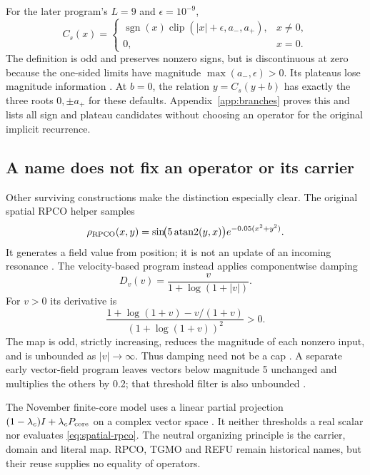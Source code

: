\documentclass[11pt,a4paper]{article}
\theoremstyle{definition}
\DeclareMathOperator{\sgn}{sgn}
\DeclareMathOperator{\clip}{clip}
\numberwithin{equation}{section}
\begin{document}
For the later program's $L=9$ and $\epsilon=10^{-9}$,
\begin{equation}
 C_s(x)=
 \begin{cases}
 \sgn(x)\clip(|x|+\epsilon,a_-,a_+),&x\ne0,\\
 0,&x=0.
 \end{cases}
 \label{eq:signed-branches}
\end{equation}
The definition is odd and preserves nonzero signs, but is discontinuous at
zero because the one-sided limits have magnitude
$\max(a_-,\epsilon)>0$. Its plateaus lose magnitude information
\cite[lines 49--53]{Infinity}.
At $b=0$, the relation $y=C_s(y+b)$ has exactly the three roots
$0,\pm a_+$ for these defaults. Appendix~\ref{app:branches} proves this
and lists all sign and plateau candidates without choosing an operator
for the original implicit recurrence.

\subsection{A name does not fix an operator or its carrier}

Other surviving constructions make the distinction especially clear.
The original spatial RPCO helper samples
\begin{equation}
 \rho_{\rm RPCO}(x,y)=
 \sin\!\bigl(5\operatorname{atan2}(y,x)\bigr)
 e^{-0.05(x^2+y^2)}.
 \label{eq:spatial-rpco}
\end{equation}
It generates a field value from position; it is not an update of an incoming
resonance \cite[lines 5--13]{RPCO}.
The velocity-based program instead applies componentwise damping
\begin{equation}
 D_v(v)=\frac{v}{1+\log(1+|v|)}.
 \label{eq:velocity-damping}
\end{equation}
For $v>0$ its derivative is
\[
 \frac{1+\log(1+v)-v/(1+v)}
      {(1+\log(1+v))^2}>0.
\]
The map is odd, strictly increasing, reduces the magnitude of each nonzero
input, and is unbounded as $|v|\to\infty$. Thus damping need not be a cap
\cite[lines 29--31]{Attractor}.
A separate early vector-field program leaves vectors below magnitude 5
unchanged and multiplies the others by 0.2; that threshold filter is also
unbounded \cite[lines 28--32]{Helicity}.

The November finite-core model uses a linear partial projection
$(1-\lambda_c)I+\lambda_c P_{\rm core}$ on a complex vector space
\cite[physical p.~5, \S3.1]{P15}. It neither thresholds a real scalar nor
evaluates \eqref{eq:spatial-rpco}. The neutral organizing principle is the
carrier, domain and literal map. RPCO, TGMO and REFU remain historical names,
but their reuse supplies no equality of operators.
\end{document}
